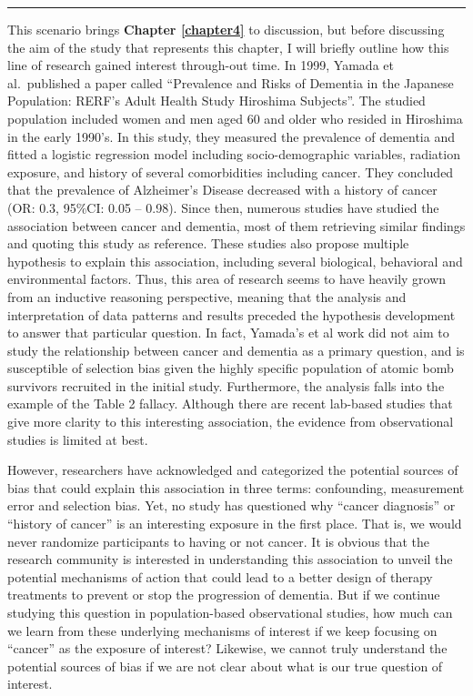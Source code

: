\documentclass[
]{book}
\begin{document}
\begin{center}\rule{0.5\linewidth}{0.5pt}\end{center}

This scenario brings \textbf{Chapter \ref{chapter4}} to discussion, but before discussing the aim of the study that represents this chapter, I will briefly outline how this line of research gained interest through-out time. In 1999, Yamada et al.~published a paper called ``Prevalence and Risks of Dementia in the Japanese Population: RERF's Adult Health Study Hiroshima Subjects''\autocite{yamada1999}. The studied population included women and men aged 60 and older who resided in Hiroshima in the early 1990's. In this study, they measured the prevalence of dementia and fitted a logistic regression model including socio-demographic variables, radiation exposure, and history of several comorbidities including cancer. They concluded that the prevalence of Alzheimer's Disease decreased with a history of cancer (OR: 0.3, 95\%CI: 0.05 -- 0.98). Since then, numerous studies have studied the association between cancer and dementia, most of them retrieving similar findings\autocite{ospina2020,vanderwillik2018} and quoting this study as reference. These studies also propose multiple hypothesis to explain this association, including several biological, behavioral and environmental factors\autocite{snyder2017}. Thus, this area of research seems to have heavily grown from an inductive reasoning perspective, meaning that the analysis and interpretation of data patterns and results preceded the hypothesis development to answer that particular question\autocite{banegas2000}. In fact, Yamada's et al work did not aim to study the relationship between cancer and dementia as a primary question, and is susceptible of selection bias given the highly specific population of atomic bomb survivors recruited in the initial study. Furthermore, the analysis falls into the example of the Table 2 fallacy\autocite{westreich2013}. Although there are recent lab-based studies that give more clarity to this interesting association, the evidence from observational studies is limited at best.

However, researchers have acknowledged and categorized the potential sources of bias that could explain this association in three terms: confounding, measurement error and selection bias\autocite{ganguli2015,driverbiogeront2014,frain2017,ospina2020}. Yet, no study has questioned why ``cancer diagnosis'' or ``history of cancer'' is an interesting exposure in the first place. That is, we would never randomize participants to having or not cancer. It is obvious that the research community is interested in understanding this association to unveil the potential mechanisms of action that could lead to a better design of therapy treatments to prevent or stop the progression of dementia\autocite{snyder2017}. But if we continue studying this question in population-based observational studies, how much can we learn from these underlying mechanisms of interest if we keep focusing on ``cancer'' as the exposure of interest? Likewise, we cannot truly understand the potential sources of bias if we are not clear about what is our true question of interest.
\end{document}
